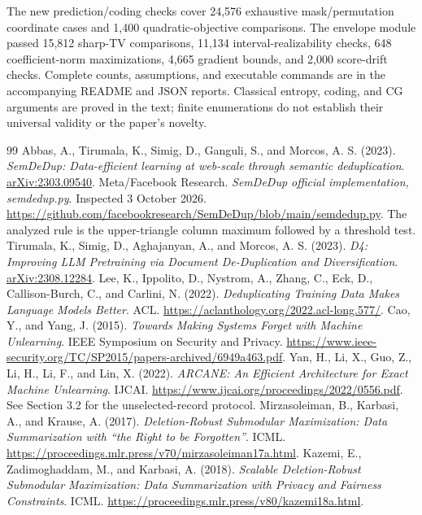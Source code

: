 \documentclass[11pt,a4paper]{article}
\theoremstyle{definition}\newtheorem{definition}[theorem]{Definition}
\begin{document}
The new prediction/coding checks cover 24,576 exhaustive mask/permutation coordinate cases and 1,400 quadratic-objective comparisons. The envelope module passed 15,812 sharp-TV comparisons, 11,134 interval-realizability checks, 648 coefficient-norm maximizations, 4,665 gradient bounds, and 2,000 score-drift checks. Complete counts, assumptions, and executable commands are in the accompanying README and JSON reports. Classical entropy, coding, and CG arguments are proved in the text; finite enumerations do not establish their universal validity or the paper's novelty.

\begin{thebibliography}{99}\small
{} Abbas, A., Tirumala, K., Simig, D., Ganguli, S., and Morcos, A. S. (2023). \emph{SemDeDup: Data-efficient learning at web-scale through semantic deduplication}. \href{https://arxiv.org/abs/2303.09540}{arXiv:2303.09540}.
 Meta/Facebook Research. \emph{SemDeDup official implementation, semdedup.py}. Inspected 3 October 2026. \url{https://github.com/facebookresearch/SemDeDup/blob/main/semdedup.py}. The analyzed rule is the upper-triangle column maximum followed by a threshold test.
 Tirumala, K., Simig, D., Aghajanyan, A., and Morcos, A. S. (2023). \emph{D4: Improving LLM Pretraining via Document De-Duplication and Diversification}. \href{https://arxiv.org/abs/2308.12284}{arXiv:2308.12284}.
 Lee, K., Ippolito, D., Nystrom, A., Zhang, C., Eck, D., Callison-Burch, C., and Carlini, N. (2022). \emph{Deduplicating Training Data Makes Language Models Better}. ACL. \url{https://aclanthology.org/2022.acl-long.577/}.
 Cao, Y., and Yang, J. (2015). \emph{Towards Making Systems Forget with Machine Unlearning}. IEEE Symposium on Security and Privacy. \url{https://www.ieee-security.org/TC/SP2015/papers-archived/6949a463.pdf}.
 Yan, H., Li, X., Guo, Z., Li, H., Li, F., and Lin, X. (2022). \emph{ARCANE: An Efficient Architecture for Exact Machine Unlearning}. IJCAI. \url{https://www.ijcai.org/proceedings/2022/0556.pdf}. See Section 3.2 for the unselected-record protocol.
 Mirzasoleiman, B., Karbasi, A., and Krause, A. (2017). \emph{Deletion-Robust Submodular Maximization: Data Summarization with ``the Right to be Forgotten''}. ICML. \url{https://proceedings.mlr.press/v70/mirzasoleiman17a.html}.
 Kazemi, E., Zadimoghaddam, M., and Karbasi, A. (2018). \emph{Scalable Deletion-Robust Submodular Maximization: Data Summarization with Privacy and Fairness Constraints}. ICML. \url{https://proceedings.mlr.press/v80/kazemi18a.html}.

\end{thebibliography}
\end{document}
